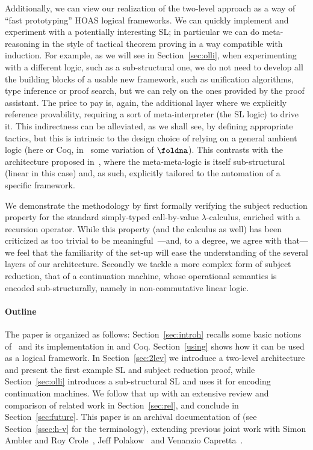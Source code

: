 \documentclass[final]{svjour3}
\begin{document}
Additionally, we can view our realization of the two-level approach as
a way of ``fast prototyping'' HOAS logical frameworks. We can quickly
implement and experiment with a potentially interesting SL; in
particular we can do meta-reasoning in the style of tactical theorem
proving in a way compatible with induction. For example, as we will
see in Section~\ref{sec:olli}, when experimenting with a different
logic, such as a sub-structural one, we do not need to develop all the
building blocks of a usable new framework, such as unification
algorithms, type inference or proof search, but we can rely on the ones
provided by the proof assistant.  The price to pay is, again, the
additional layer where we explicitly reference provability, requiring
a sort of meta-interpreter (the SL logic) to drive it.  This
indirectness can be alleviated, as we shall see, by defining
appropriate tactics, but this is intrinsic to the design choice of
relying on a general ambient logic (here \HOL or Coq,
in~\cite{McDowell01,Tiu04phd} some variation of $\foldna$). This
contrasts with the architecture proposed in~\cite{McCreight03}, where
the meta-meta-logic is itself sub-structural (linear in this case)
and, as such, explicitly tailored to the automation of a specific
framework.

We demonstrate the methodology by first formally verifying the
subject reduction property for the standard simply-typed call-by-value
$\lambda$-calculus, enriched with a recursion operator.  While this
property (and the calculus as well) has been criticized as too trivial to
be meaningful~\cite{poplmark2005}---and, to a degree, we  agree
with that---we feel that the familiarity of the set-up will ease the
understanding of the several layers of our architecture. Secondly we
tackle a more complex form of subject reduction, that of a
continuation machine, whose operational semantics is encoded
sub-structurally, namely in non-commutative linear logic.

\paragraph{Outline}

The paper is organized as follows: Section~\ref{sec:introh} recalls some
basic notions of \hybrid\ and its implementation in \HOL and Coq.
Section~\ref{using} shows how it can be used as a logical framework.  In
Section~\ref{sec:2lev} we introduce a two-level architecture and present the
first example SL and subject reduction proof,
while Section~\ref{sec:olli} introduces a sub-structural SL and uses it
for encoding continuation machines. We follow that up with an
extensive review and comparison of related work in Section~\ref{sec:rel},
and conclude in Section~\ref{sec:future}.
This paper is an archival documentation of  (see
Section~\ref{ssec:h-v} for the terminology), extending previous joint
work with Simon Ambler and Roy
Crole~\cite{MomTP01,Ambler02,Momigliano02lfm,ACM03prim,Momigliano03fos},
Jeff Polakow~\cite{MomiglianoP03} and Venanzio
Capretta~\cite{CapFel07}.
\end{document}
